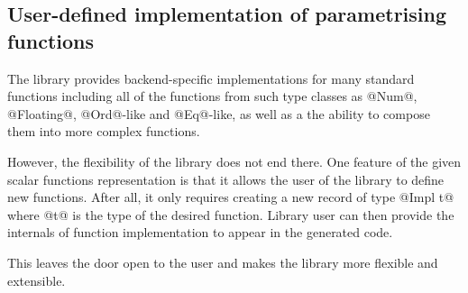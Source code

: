 \documentclass[preamble.tex]{subfiles}
\begin{document}

\subsection{User-defined implementation of parametrising functions}

The library provides backend-specific implementations for many standard functions including all of the functions from such type classes as @Num@, @Floating@, @Ord@-like and @Eq@-like, as well as a the ability to compose them into more complex functions.

However, the flexibility of the library does not end there. One feature of the given scalar functions representation is that it allows the user of the library to define new functions. After all, it only requires creating a new record of type @Impl t@ where @t@ is the type of the desired function. Library user can then provide the internals of function implementation to appear in the generated code.

This leaves the door open to the user and makes the library more flexible and extensible.
\end{document}

